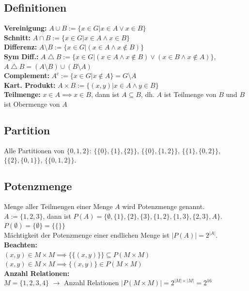 \documentclass[8pt,landscape]{scrartcl}
\begin{document}
\begin{multicols}{3}
\subsection{Definitionen}
\textbf{Vereinigung:} $A \cup B := \{ x \in G | x \in A \lor x \in B \}$\\
\textbf{Schnitt:}     $A \cap B := \{ x \in G | x \in A \land x \in B \}$\\
\textbf{Differenz:}   $A \setminus B := \{x \in G | (x \in A \land x \not\in B) \}$\\
\textbf{Sym Diff.:}   $A \bigtriangleup B := \{x \in G | (x \in A \land x \not \in B) \lor (x \in B \land x \not \in A) \}$, $A \bigtriangleup B = (A \setminus B) \cup (B \setminus A)$ \\
\textbf{Complement:}  $A^c := \{x \in G | x \not \in A \} = G \setminus A$\\
\textbf{Kart. Produkt:} $A \times B := \{ (x, y) | x \in A \land y \in B \}$\\
\textbf{Teilmenge:} $x \in A \implies x \in B$, dann ist $A \subseteq B$, dh. $A$ ist Teilmenge von $B$ und $B$ ist Obermenge von $A$





\subsection{Partition}
Alle Partitionen von $\{0, 1, 2\}$:
$\{ \{0\}, \{1\}, \{2\} \}$, $\{ \{0\}, \{1, 2\} \}$, $\{ \{1\}, \{0, 2\} \}$, $\{ \{2\}, \{0, 1\} \}$, $\{ \{0, 1, 2\} \}$.


\subsection{Potenzmenge}
Menge aller Teilmengen einer Menge $A$ wird Potenzmenge genannt.\\
$A := \{ 1, 2, 3 \}$, dann ist $P(A) = \{ \emptyset, \{1\}, \{2\}, \{3\}, \{1, 2\}, \{1, 3\}, \{2, 3\}, A\}$.\\
$P(\emptyset) = \{ \emptyset \} = \{ \{ \} \}$\\
M\"achtigkeit der Potenzmenge einer endlichen Menge ist $\left|P(A)\right| = 2^{|A|}$.\\
\textbf{Beachten:}\\
$(x, y) \in M \times M \implies \{ \{ (x, y) \} \} \subseteq P(M \times M)$\\
$(x, y) \in M \times M \implies \{ (x, y) \} \in P(M \times M)$\\
\textbf{Anzahl Relationen:}\\
$M = \{ 1, 2, 3, 4 \}$ $\rightarrow$ Anzahl Relationen $| P( M \times M ) | = 2^{ |M| \times |M| } = 2^{16}$






\end{multicols}
\end{document}
